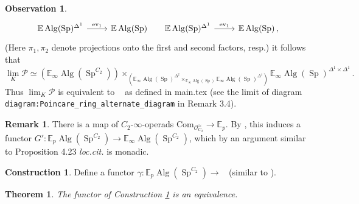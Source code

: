 \documentclass{article}
\DeclareMathOperator{\Alg}{Alg}
\DeclareMathOperator{\CAlgp}{CAlg^p} %
\DeclareMathOperator{\Spectra}{Sp} %
\newcommand{\EE}{\mathbb{E}}
\newcommand{\ev}{\mathrm{ev}}
\newtheorem{theorem}[equation]{Theorem}
\theoremstyle{definition}
\newtheorem{construction}[equation]{Construction}
\newtheorem{remark}[equation]{Remark}
\newtheorem{observation}[equation]{Observation}
\begin{document}
\begin{observation}
\begin{equation}
\begin{tikzcd}[column sep=small]
        \EE\Alg(\Spectra)^{\Delta^1} \ar[rr,"{\ev_1}"] & & \EE\Alg(\Spectra) & \EE\Alg(\Spectra)^{\Delta^1} \ar[rr,"{\ev_1}"] & & \EE\Alg(\Spectra)\,,
    \end{tikzcd}
    \end{equation} 
    (Here $ \pi_1, \pi_2 $ denote projections onto the first and second factors, resp.) 
    it follows that 
    \begin{equation*}
        \lim_K \mathcal{P} \simeq \left(\EE_\infty \Alg\left(\Spectra^{C_2}\right)\right) \times_{\left(\EE_\infty\Alg(\Spectra)^{\Delta^2} \times_{\EE_\infty \Alg(\Spectra)} \EE_\infty\Alg(\Spectra)^{\Delta^1}\right)} \EE_\infty\Alg(\Spectra)^{\Delta^1 \times \Delta^1} \,.
    \end{equation*}
    Thus $ \lim_K \mathcal{P} $ is equivalent to $ \CAlgp $ as defined in main.tex (see the limit of diagram \texttt{diagram:Poincare\_ring\_alternate\_diagram} in Remark 3.4). 
\end{observation}
\begin{remark}\label{rmk:operadic_Poincare_rings_to_E_infty_alg_in_genuine_spectra}
    There is a map of $ C_2 $-$ \infty $-operads $ \mathrm{Com}_{\mathcal{O}_{C_2}^\simeq} \to \EE_p $. 
    By \cite[Lemma 4.24]{LYang_normedrings}, this induces a functor $ G'\colon \EE_p\Alg\left(\Spectra^{C_2}\right) \to \EE_\infty\Alg\left(\Spectra^{C_2}\right) $, which by an argument similar to Proposition 4.23 \emph{loc.cit.} is monadic. 
\end{remark}
\begin{construction}\label{cons:calgp_operadic_to_diagrammatic}
    Define a functor $ \gamma \colon \EE_p \Alg(\Spectra^{C_2}) \to \CAlgp $ (similar to \cite[\S4.1]{LYang_normedrings}). 
\end{construction}
\begin{theorem}\label{thm:operadic_diagrammatic_calgp_agree}
    The functor of Construction \ref{cons:calgp_operadic_to_diagrammatic} is an equivalence. 
\end{theorem}
\end{document}
